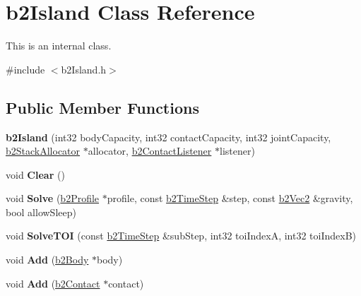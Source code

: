 \hypertarget{classb2_island}{}\section{b2\+Island Class Reference}
\label{classb2_island}


This is an internal class.  




{\ttfamily \#include $<$b2\+Island.\+h$>$}

\subsection*{Public Member Functions}
\begin{DoxyCompactItemize}
\item 
{\bfseries b2\+Island} (int32 body\+Capacity, int32 contact\+Capacity, int32 joint\+Capacity, \hyperlink{classb2_stack_allocator}{b2\+Stack\+Allocator} $\ast$allocator, \hyperlink{classb2_contact_listener}{b2\+Contact\+Listener} $\ast$listener)\hypertarget{classb2_island_a2f2258f09d2663dcb35a1d69d16896cb}{}\label{classb2_island_a2f2258f09d2663dcb35a1d69d16896cb}

\item 
void {\bfseries Clear} ()\hypertarget{classb2_island_a26566f7388fcaf7523446e5e76d99c4d}{}\label{classb2_island_a26566f7388fcaf7523446e5e76d99c4d}

\item 
void {\bfseries Solve} (\hyperlink{structb2_profile}{b2\+Profile} $\ast$profile, const \hyperlink{structb2_time_step}{b2\+Time\+Step} \&step, const \hyperlink{structb2_vec2}{b2\+Vec2} \&gravity, bool allow\+Sleep)\hypertarget{classb2_island_a28a6f74174cde3a6e93663c740f418fa}{}\label{classb2_island_a28a6f74174cde3a6e93663c740f418fa}

\item 
void {\bfseries Solve\+T\+OI} (const \hyperlink{structb2_time_step}{b2\+Time\+Step} \&sub\+Step, int32 toi\+IndexA, int32 toi\+IndexB)\hypertarget{classb2_island_a61f577b473962bb0d8add1f55eeef7ee}{}\label{classb2_island_a61f577b473962bb0d8add1f55eeef7ee}

\item 
void {\bfseries Add} (\hyperlink{classb2_body}{b2\+Body} $\ast$body)\hypertarget{classb2_island_af2d54861bd063051c0a6dc5f73b27c3e}{}\label{classb2_island_af2d54861bd063051c0a6dc5f73b27c3e}

\item 
void {\bfseries Add} (\hyperlink{classb2_contact}{b2\+Contact} $\ast$contact)\hypertarget{classb2_island_abc0ea9208e818b551404fd507f197a51}{}\label{classb2_island_abc0ea9208e818b551404fd507f197a51}


\end{DoxyCompactItemize}
